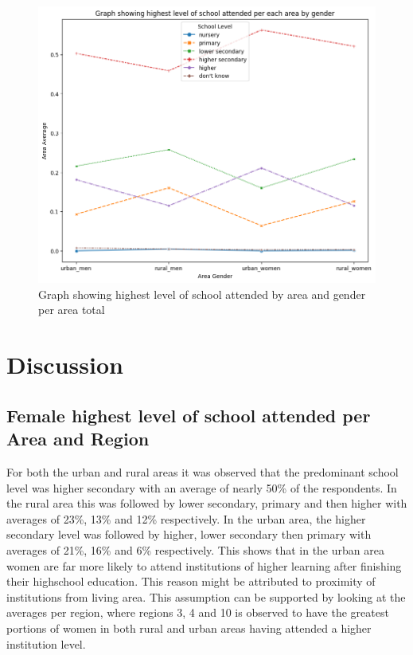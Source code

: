 \documentclass[stu, 12pt, floatsintext,longtable]{apa7}
\begin{document}
\begin{figure}[H]
    \centering

    \includegraphics[width=\linewidth]{graphics/male_female_attendance_averages.png}
    \caption{Graph showing highest level of school attended by area and gender
        per area total}
    \label{fig:male_female_average}
\end{figure}
\newpage
\section{Discussion}
\subsection{Female highest level of school attended per Area and Region}

For both the urban and rural areas it was observed that the predominant school
level was higher secondary with an average of nearly 50\% of the respondents.
In the rural area this was followed by lower secondary,
primary and then higher with averages of 23\%, 13\% and 12\% respectively.
In the urban area, the higher secondary level was followed by higher, lower
secondary then primary with averages of 21\%, 16\% and 6\% respectively.
This shows that in the urban area women are far more likely to attend
institutions of higher learning after finishing their highschool education.
This reason might be attributed to proximity of institutions from living area.
This assumption can be supported by looking at the averages per region, where
regions 3, 4 and 10 is observed to have the greatest portions of women in both
rural and urban areas having attended a higher institution level.
\end{document}
